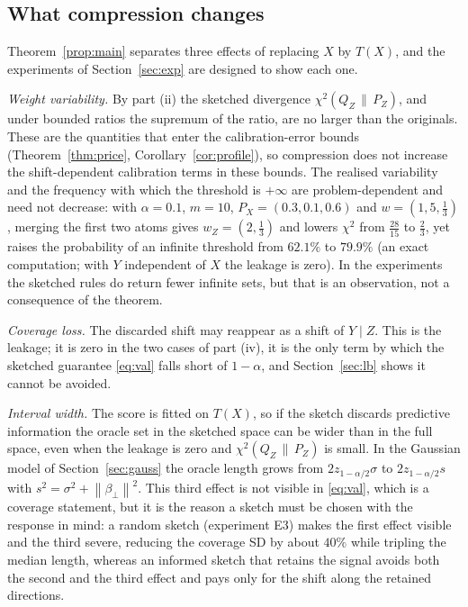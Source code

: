 \documentclass[11pt,a4paper]{article}
\newcommand{\PX}{P_X}
\newcommand{\chisqZ}{\chi^2(Q_Z\,\|\,P_Z)}
\newcommand{\norm}[1]{\left\|#1\right\|}
\theoremstyle{plain}
\theoremstyle{definition}
\theoremstyle{remark}
\begin{document}
\subsection{What compression changes}\label{sec:three}

Theorem~\ref{prop:main} separates three effects of replacing $X$ by $T(X)$, and the experiments of Section~\ref{sec:exp} are designed to show each one.

\emph{Weight variability.} By part (ii) the sketched divergence $\chisqZ$, and under bounded ratios the supremum of the ratio, are no larger than the originals. These are the quantities that enter the calibration-error bounds (Theorem~\ref{thm:price}, Corollary~\ref{cor:profile}), so compression does not increase the shift-dependent calibration terms in these bounds. The realised variability and the frequency with which the threshold is $+\infty$ are problem-dependent and need not decrease: with $\alpha=0.1$, $m=10$, $\PX=(0.3,0.1,0.6)$ and $w=(1,5,\tfrac13)$, merging the first two atoms gives $w_Z=(2,\tfrac13)$ and lowers $\chi^2$ from $\tfrac{28}{15}$ to $\tfrac23$, yet raises the probability of an infinite threshold from $62.1\%$ to $79.9\%$ (an exact computation; with $Y$ independent of $X$ the leakage is zero). In the experiments the sketched rules do return fewer infinite sets, but that is an observation, not a consequence of the theorem.

\emph{Coverage loss.} The discarded shift may reappear as a shift of $Y\mid Z$. This is the leakage; it is zero in the two cases of part (iv), it is the only term by which the sketched guarantee \eqref{eq:val} falls short of $1-\alpha$, and Section~\ref{sec:lb} shows it cannot be avoided.

\emph{Interval width.} The score is fitted on $T(X)$, so if the sketch discards predictive information the oracle set in the sketched space can be wider than in the full space, even when the leakage is zero and $\chisqZ$ is small. In the Gaussian model of Section~\ref{sec:gauss} the oracle length grows from $2z_{1-\alpha/2}\sigma$ to $2z_{1-\alpha/2}s$ with $s^2=\sigma^2+\norm{\beta_\perp}^2$. This third effect is not visible in \eqref{eq:val}, which is a coverage statement, but it is the reason a sketch must be chosen with the response in mind: a random sketch (experiment E3) makes the first effect visible and the third severe, reducing the coverage SD by about $40\%$ while tripling the median length, whereas an informed sketch that retains the signal avoids both the second and the third effect and pays only for the shift along the retained directions.
\end{document}

